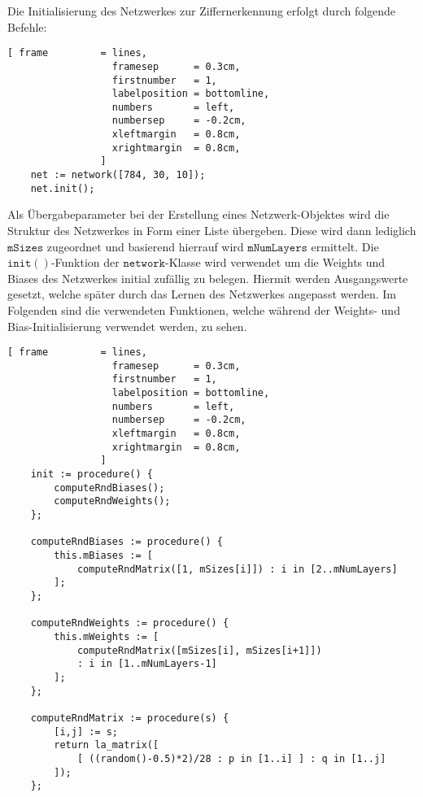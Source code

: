 \noindent
Die Initialisierung des Netzwerkes zur Ziffernerkennung erfolgt durch folgende Befehle:
\begin{Verbatim}[ frame         = lines, 
                  framesep      = 0.3cm, 
                  firstnumber   = 1,
                  labelposition = bottomline,
                  numbers       = left,
                  numbersep     = -0.2cm,
                  xleftmargin   = 0.8cm,
                  xrightmargin  = 0.8cm,
                ]
    net := network([784, 30, 10]);
    net.init();
\end{Verbatim}
Als Übergabeparameter bei der Erstellung eines Netzwerk-Objektes wird die Struktur des Netzwerkes in Form einer Liste übergeben. Diese wird dann lediglich $\mathtt{mSizes}$ zugeordnet und basierend hierrauf wird $\mathtt{mNumLayers}$ ermittelt.
Die $\mathtt{init()}$-Funktion der $\mathtt{network}$-Klasse wird verwendet um die Weights und Biases des Netzwerkes initial zufällig zu belegen. Hiermit werden Ausgangswerte gesetzt, welche später durch das Lernen des Netzwerkes angepasst werden.
Im Folgenden sind die verwendeten Funktionen, welche während der Weights- und Bias-Initialisierung verwendet werden, zu sehen.
\begin{Verbatim}[ frame         = lines, 
                  framesep      = 0.3cm, 
                  firstnumber   = 1,
                  labelposition = bottomline,
                  numbers       = left,
                  numbersep     = -0.2cm,
                  xleftmargin   = 0.8cm,
                  xrightmargin  = 0.8cm,
                ]
	init := procedure() {
		computeRndBiases();
		computeRndWeights();
	};

	computeRndBiases := procedure() {
		this.mBiases := [ 
			computeRndMatrix([1, mSizes[i]]) : i in [2..mNumLayers] 
		];
	};

	computeRndWeights := procedure() {
		this.mWeights := [ 
			computeRndMatrix([mSizes[i], mSizes[i+1]]) 
			: i in [1..mNumLayers-1] 
		];
	};

	computeRndMatrix := procedure(s) {
		[i,j] := s;
		return la_matrix([
			[ ((random()-0.5)*2)/28 : p in [1..i] ] : q in [1..j]
		]);
	};
\end{Verbatim}

